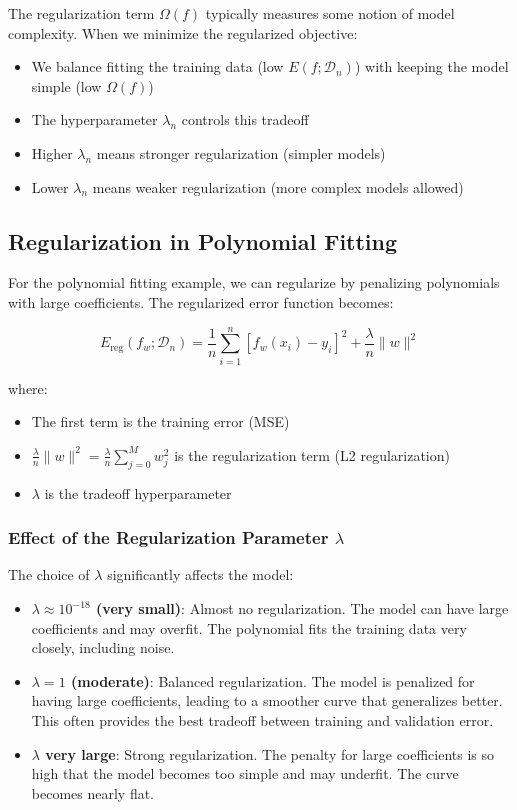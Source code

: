 \documentclass[11pt,a4paper]{article}
\theoremstyle{definition}
\theoremstyle{plain}
\theoremstyle{remark}
\begin{document}
The regularization term $\Omega(f)$ typically measures some notion of model complexity. When we minimize the regularized objective:
\begin{itemize}
    \item We balance fitting the training data (low $E(f; \mathcal{D}_n)$) with keeping the model simple (low $\Omega(f)$)
    \item The hyperparameter $\lambda_n$ controls this tradeoff
    \item Higher $\lambda_n$ means stronger regularization (simpler models)
    \item Lower $\lambda_n$ means weaker regularization (more complex models allowed)
\end{itemize}

\subsection{Regularization in Polynomial Fitting}

For the polynomial fitting example, we can regularize by penalizing polynomials with large coefficients. The regularized error function becomes:

\[
E_{\text{reg}}(f_w; \mathcal{D}_n) = \frac{1}{n} \sum_{i=1}^{n} [f_w(x_i) - y_i]^2 + \frac{\lambda}{n} \|w\|^2
\]

where:
\begin{itemize}
    \item The first term is the training error (MSE)
    \item $\frac{\lambda}{n} \|w\|^2 = \frac{\lambda}{n} \sum_{j=0}^{M} w_j^2$ is the regularization term (L2 regularization)
    \item $\lambda$ is the tradeoff hyperparameter
\end{itemize}

\subsubsection{Effect of the Regularization Parameter $\lambda$}

The choice of $\lambda$ significantly affects the model:

\begin{itemize}
    \item \textbf{$\lambda \approx 10^{-18}$ (very small)}: Almost no regularization. The model can have large coefficients and may overfit. The polynomial fits the training data very closely, including noise.
    
    \item \textbf{$\lambda = 1$ (moderate)}: Balanced regularization. The model is penalized for having large coefficients, leading to a smoother curve that generalizes better. This often provides the best tradeoff between training and validation error.
    
    \item \textbf{$\lambda$ very large}: Strong regularization. The penalty for large coefficients is so high that the model becomes too simple and may underfit. The curve becomes nearly flat.
\end{itemize}
\end{document}
